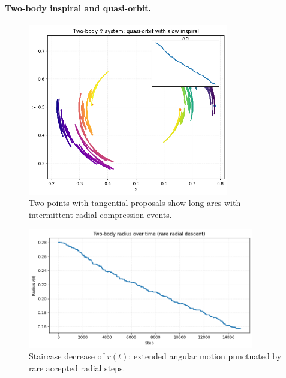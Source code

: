 \documentclass[aps,preprint,onecolumn,longbibliography,nofootinbib]{revtex4-2}
\numberwithin{equation}{section}
\begin{document}
\paragraph*{Two-body inspiral and quasi-orbit.}
\begin{figure}[H]
\centering
\includegraphics[width=0.78\textwidth]{figures/orbit_two_body.png}
\caption{Two points with tangential proposals show long arcs with intermittent radial-compression events.}
\label{fig:twoorbit}
\end{figure}

\begin{figure}[H]
\centering
\includegraphics[width=0.88\textwidth]{figures/two_body_r_vs_t.png}
\caption{Staircase decrease of $r(t)$: extended angular motion punctuated by rare accepted radial steps.}
\label{fig:tworadius}
\end{figure}
\end{document}
